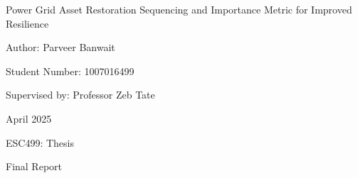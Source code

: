\documentclass[12pt]{article}
\begin{document}
\setlength{\cftaftertoctitleskip}{2cm} %
\setlength{\cftafterloftitleskip}{2cm} %
\begin{titlepage}
    \centering %
    {\Huge Power Grid Asset Restoration Sequencing and Importance Metric for Improved Resilience \par} %
    \vspace{2cm}
    {\huge Author: Parveer Banwait \par}
    \vspace{0.25cm}
    {\large Student Number: 1007016499 \par}
    \vspace{1cm}
    {\Large Supervised by: Professor Zeb Tate \par}
    \vfill %
    {\Large April 2025 \par}
    \vspace{0.25cm}
    {\Large ESC499: Thesis \par}
    \vspace{0.25cm}
    {\Large Final Report \par}
\end{titlepage}
\vspace*{\fill}
\begin{abstract}
\begin{spacing}{1.0}
Extreme weather continues to impact power system operations, as demonstrated by a recent Ontario ice storm, which left almost 400,000 people without power. This problem is expected to worsen due to climate change. In response, this paper proposes two methods for improving power system resilience. In the short term, pruning methods were developed to determine the optimal repair sequence for damaged grid assets, minimizing the event's impact. For smaller sets of damaged assets, these methods provided near-optimal solutions. Different pruning methods provide varying levels computational costs and efficacy to be used in different use cases. In the long term, an asset importance metric is presented to efficiently allocate grid improvement resources. Using a semi-realistic tornado generator and fragility analysis, we applied this metric to assets in a mock grid representing Texas’s power grid, as a proof of concept. The results show that importance values for transmission lines can be calculated within one week of simulation.
\end{spacing}
\end{abstract}
\vspace*{\fill}
\newpage
\renewcommand{\abstractname}{Acknowledgements}  %
\vspace*{\fill}
\begin{abstract}
I would like to express my gratitude to my supervisor, Professor Zeb Tate, for their support as I completed this thesis project. I would also like to thank Professor Taeyong Kim for providing me with his expertise on fragility analysis, as well as Professor Morgan O'Neill for her advice on weather event generation.
\end{abstract}
\vspace*{\fill}
\end{document}
